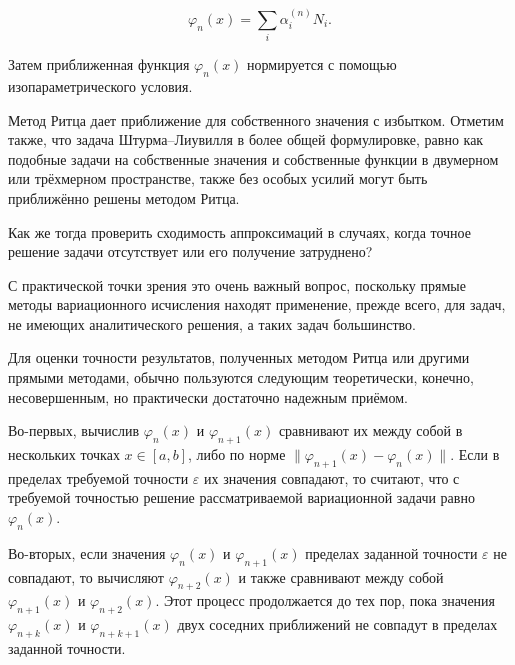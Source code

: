 \documentclass{article}
\begin{document}
\begin{displaymath}
	\varphi_{n}(x) = \sum_{i}^{} \alpha_{i}^{(n)} N_{i}. 
\end{displaymath}

\noindent Затем приближенная функция $\varphi_{n}(x)$ нормируется с помощью изопараметрического условия.

\begin{info}
	Метод Ритца дает приближение для собственного значения с избытком. Отметим также, что задача Штурма--Лиувилля в более общей формулировке, равно как подобные задачи на собственные значения и собственные функции в двумерном или трёхмерном пространстве, также без особых усилий могут быть приближённо решены методом Ритца.
\end{info}

\begin{question}
	Как же тогда проверить сходимость аппроксимаций в случаях, когда точное решение задачи отсутствует или его получение затруднено?
\end{question}

С практической точки зрения это очень важный вопрос, поскольку прямые методы вариационного исчисления находят применение, прежде всего, для задач, не имеющих аналитического решения, а таких задач большинство.

Для оценки точности результатов, полученных методом Ритца или другими прямыми методами, обычно пользуются следующим теоретически, конечно, несовершенным, но практически достаточно надежным приёмом.

Во-первых, вычислив $\varphi_{n}(x)$ и $\varphi_{n+1}(x)$ сравнивают их между собой в нескольких точках $ x \in \left[a, b\right] $, либо по норме $ \parallel\varphi_{n+1}(x) - \varphi_{n}(x)\parallel$. Если в пределах требуемой точности $ \varepsilon $ их значения совпадают, то считают, что с требуемой точностью решение рассматриваемой вариационной задачи равно $ \varphi_{n}(x) $.

Во-вторых, если значения $\varphi_{n}(x)$ и $\varphi_{n+1}(x)$ пределах заданной точности $\varepsilon$ не совпадают, то вычисляют $\varphi_{n+2}(x)$ и также сравнивают между собой $\varphi_{n+1}(x)$ и $\varphi_{n+2}(x)$. Этот процесс продолжается до тех пор, пока значения $\varphi_{n+k}(x)$ и $\varphi_{n+k+1}(x)$ двух соседних приближений не совпадут в пределах заданной точности.
\end{document}
